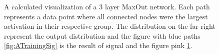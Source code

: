 \begin{figure}
{\begin{subfigure}{.6\textwidth}
        \caption{}
        \label{fig:ATrainingBkg}
    \end{subfigure}
    }
    \caption{A calculated visualization of a 3 layer MaxOut network. Each path 
    represents a data point where all connected nodes were the largest activation in their respective 
    group. The distribution on the far right represent the output distribution and the figure with blue 
    paths \ref{fig:ATrainingSig} is the result of signal and the figure pink \ref{fig:ATrainingBkg}.
    } 
    \label{fig:NetDist1}
\end{figure}

\begin{figure}
\end{figure}
